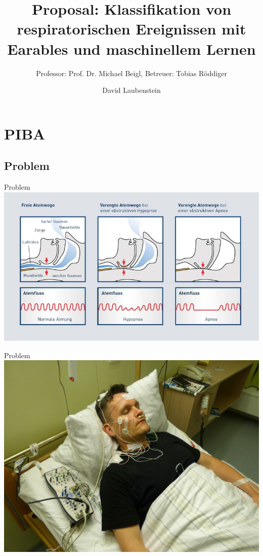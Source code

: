 \documentclass[18pt]{beamer}
\title[Proposal Bachelorarbeit]{Proposal: Klassifikation von respiratorischen Ereignissen mit Earables und maschinellem Lernen}
\subtitle{Professor: Prof. Dr. Michael Beigl, Betreuer: Tobias Röddiger}
\author{David Laubenstein}
\institute{Lehrstuhl Pervasive Computing Systems}
\begin{document}

\begin{frame}
\titlepage
\end{frame}


\section{PIBA}
\subsection{Problem}
\begin{frame}{Problem}
    \includegraphics[scale=0.4]{logos/was-passiert-bei-schlafapnoe}
\end{frame}

\begin{frame}{Problem}
    \includegraphics[scale=0.12]{logos/sleepLabor}
\end{frame}
\end{document}
